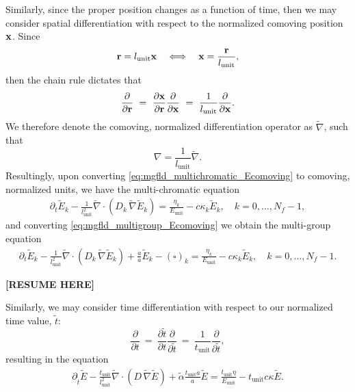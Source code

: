 \documentclass[10pt]{article}
\renewcommand{\(}{\left(}
\renewcommand{\)}{\right)}
\newcommand{\xvec}{{\bf x}}
\newcommand{\rvec}{{\bf r}}
\newcommand{\adot}{\dot{a}}
\newcommand{\Lunit}{l_{\text{unit}}}
\newcommand{\Tunit}{t_{\text{unit}}}
\newcommand{\Eunit}{E_{\text{unit}}}
\newcommand{\tT}{\tilde{t}}
\newcommand{\tE}{\tilde{E}}
\newcommand{\talpha}{\tilde{\alpha}}
\newcommand{\tnabla}{\tilde{\nabla}}
\begin{document}
Similarly, since the proper position changes as a function of time,
then we may consider spatial differentiation with respect to the
normalized comoving position $\xvec$.  Since 
\[
   \rvec = \Lunit \xvec \quad\Longleftrightarrow\quad
   \xvec = \frac{\rvec}{\Lunit},
\]
then the chain rule dictates that
\[
   \frac{\partial}{\partial \rvec} \ = \
   \frac{\partial \xvec}{\partial \rvec}
   \frac{\partial}{\partial \xvec} \ = \
   \frac{1}{\Lunit}\frac{\partial}{\partial \xvec}.
\]
We therefore denote the comoving, normalized differentiation operator
as $\tnabla$, such that 
\[
   \nabla = \frac{1}{\Lunit}\tnabla.
\]
Resultingly, upon converting \eqref{eq:mgfld_multichromatic_Ecomoving}
to comoving, normalized units, we have the multi-chromatic equation
\begin{align}
  \label{eq:mgfld_multichromatic_comoving}
  \partial_{t} \tE_k - \frac{1}{\Lunit^2}\tnabla\cdot\(D_k\,\tnabla \tE_k\)
    = \frac{\eta_k}{\Eunit} - c\kappa_k \tE_k, \quad k=0,\ldots,N_f-1,
\end{align}
and converting \eqref{eq:mgfld_multigroup_Ecomoving} we obtain the
multi-group equation 
\begin{align}
  \label{eq:mgfld_multigroup_comoving}
  \partial_{t} \tE_k - \frac{1}{\Lunit^2}\tnabla\cdot(D_k\,\tnabla \tE_k) +
    \frac{\adot}{a}\tE_k - (\square)_k = \frac{\eta_k}{\Eunit} - c
    \kappa_k \tE_k, \quad k=0,\ldots,N_f-1.
\end{align}

{\bf [RESUME HERE]}



Similarly, we may consider time differentiation with respect to our
normalized time value, $\tT$:
\[
   \frac{\partial}{\partial t} \ = \
   \frac{\partial \tT}{\partial t} \frac{\partial}{\partial \tT} \ = \
   \frac{1}{\Tunit}\frac{\partial}{\partial \tT},
\]
resulting in the equation
\begin{align}
  \label{eq:mgfld_grey_comoving_tnormalized}
  \partial_{\tT} \tE - \frac{\Tunit}{\Lunit^2}\tnabla\cdot\(D\,\tnabla \tE\)
    + \talpha\frac{\Tunit \adot}{a} \tE = \frac{\Tunit\eta}{\Eunit} -
    \Tunit c\kappa \tE.
\end{align}
\end{document}
